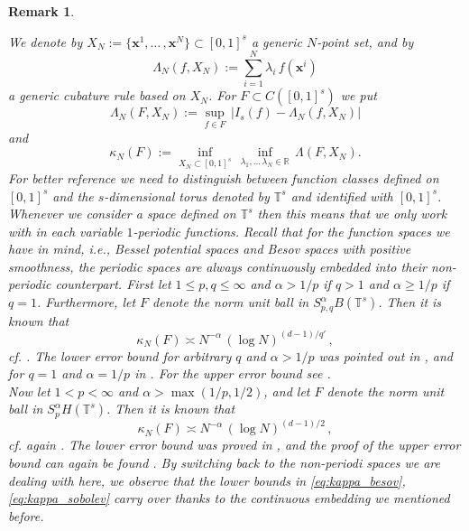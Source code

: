\documentclass[12pt]{article}
\newtheorem{lemma}{Lemma}
\newtheorem{remark}{Remark}
\newcommand{\bsx}{\boldsymbol{x}}
\newcommand{\real}{\mathbb{R}}
\newcommand{\red}[1]{\textcolor{red}{#1}}
\begin{document}
\begin{remark}\label{Rem:Known_Int_Besov_Sobolev} 

We denote by $X_N := \{\bsx^1, \ldots \, , \bsx^N\} \subset [0,1]^s$ a generic $N$-point set, and by
\[
\Lambda_N (f,X_N):= \sum_{i=1}^N \lambda_i \, f(\bsx^i)
\]
a generic cubature rule based on $X_N$. For $F \subset C([0,1]^s)$ we put
\[
 \Lambda_N (F,X_N):= \sup_{f\in F}\, \bigg| %
I_s(f)  - \Lambda_N (f,X_N)\bigg| 
\]
and 
\[
 \kappa_N (F):= \inf_{X_N \subset [0,1]^s}\, \inf_{\lambda_1, \ldots \, \lambda_N \in \real}
 \, \Lambda (F,X_N).
\]
For better reference we need to distinguish between function classes defined on $[0,1]^s$ and the $s$-dimensional torus denoted by $\mathbb{T}^s$ and identified with $[0,1]^s$.
Whenever we consider a space defined on  $\mathbb{T}^s$ then this means that we only work with  in each variable $1$-periodic  functions. Recall that for the function spaces we have in mind, i.e., Bessel potential spaces and Besov spaces
with positive smoothness, the periodic spaces are always continuously embedded into their non-periodic counterpart. 
 First let $1\le p,q \le \infty$ and $\alpha >1/p$ if $q>1$ and $\alpha \ge 1/p$ if $q=1$. Furthermore,  let $F$ denote the norm unit ball in $S^\alpha_{p,q}B(\mathbb{T}^s)$. 
 Then it is known that 
 \begin{equation}\label{eq:kappa_besov}
 \kappa_N (F) \asymp N^{-\alpha}\, (\log N)^{(d-1)/q'}\, , %
 \end{equation}
 cf. \cite[Theorem~8.5.1]{DTU}. The lower error bound for arbitrary $q$  and $\alpha > 1/p$  was pointed out in \cite{Tem15}, and for $q=1$ and $\alpha=1/p$  in \cite{UU15}. For the upper error bound see \cite{NUU17}.\\ 
 Now let $1<  p < \infty$ and $\alpha > \max(1/p, 1/2)$, and let $F$ denote the norm unit ball in $S^\alpha_{p}H(\mathbb{T}^s)$. 
 Then it is known that 
 \begin{equation}\label{eq:kappa_sobolev}
 \kappa_N (F) \asymp N^{-\alpha}\, (\log N)^{(d-1)/2}\, , %
 \end{equation}
 cf. again \cite[Theorem~8.5.1]{DTU}. The lower error bound was proved in \cite{Tem15}, and the proof of the upper error bound can again be found  \cite{NUU17}. By switching back to the non-periodi spaces we are dealing with here, we observe that the lower bounds in \eqref{eq:kappa_besov}, \eqref{eq:kappa_sobolev} carry over thanks to the continuous embedding we mentioned before.


\end{remark}
\end{document}
